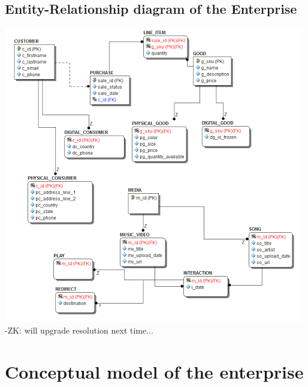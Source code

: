 \documentclass[11pt, a4paper]{report}
\begin{document}
\clearpage
\subsection{Entity-Relationship diagram of the Enterprise}
\includegraphics[]{ERB.png}
-ZK: will upgrade resolution next time...

\clearpage
\section{Conceptual model of the enterprise}
\end{document}
